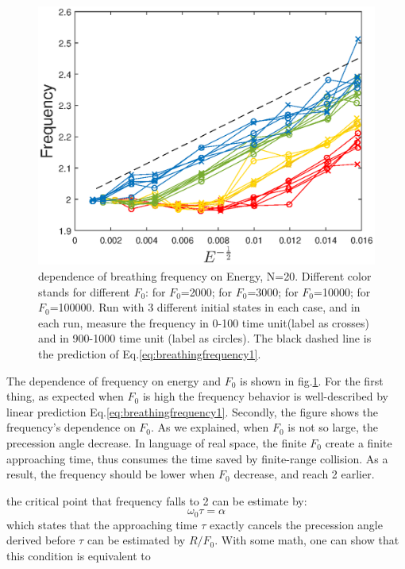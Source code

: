 \documentclass[aps,pre,twocolumn,groupedaddress]{revtex4-1}
\begin{document}
\begin{figure}
\centering
\includegraphics[scale=0.6]{ZhiyuPictures/freq_scanF_scanE_pre.eps}
\caption{dependence of breathing frequency on Energy, N=20. Different color stands for different $F_0$: {\color{red}{Red}} for $F_0$=2000; {\color{yellow}{Yellow}} for $F_0$=3000; {\color{green}{Green}} for $F_0$=10000;  {\color{blue}{Blue}} for $F_0$=100000. Run with 3 different initial states in each case, and in each run, measure the frequency in 0-100 time unit(label as crosses) and in 900-1000 time unit (label as circles). The black dashed line is the prediction of Eq.\ref{eq:breathingfrequency1}.}
\label{fig:Breathingfrequency4}
\end{figure}

The dependence of frequency on energy and $F_0$ is shown in fig.\ref{fig:Breathingfrequency4}. For the first thing, as expected when $F_0$ is high the frequency behavior is well-described by linear prediction Eq.\ref{eq:breathingfrequency1}. Secondly, the figure shows the frequency's dependence on $F_0$. As we explained, when $F_0$ is not so large, the precession angle decrease. In language of real space, the finite $F_0$ create a finite approaching time, thus consumes the time saved by finite-range collision. As a result, the frequency should be lower when $F_0$ decrease, and reach 2 earlier.

the critical point that frequency falls to 2 can be estimate by:
\begin{equation}
\omega_0 \tau=\alpha
\end{equation}
which states that the approaching time $\tau$ exactly cancels the precession angle derived before
$\tau$ can be estimated by $R/F_0$. With some math, one can show that this condition is equivalent to 
\end{document}
